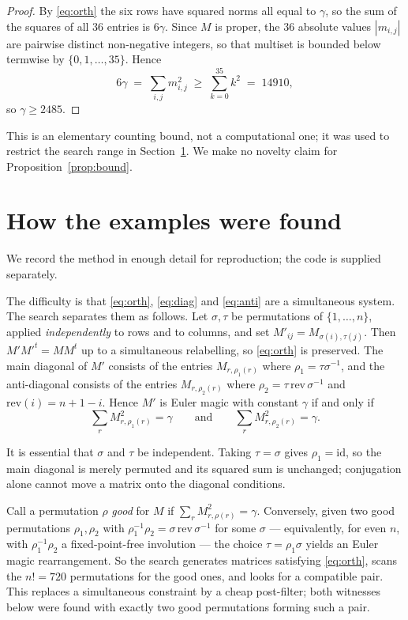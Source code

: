 \documentclass[11pt]{amsart}
\theoremstyle{plain}
\theoremstyle{definition}
\begin{document}
\begin{proof}
By \eqref{eq:orth} the six rows have squared norms all equal to $\gamma$, so the
sum of the squares of all $36$ entries is $6\gamma$. Since $M$ is proper, the
$36$ absolute values $|m_{i,j}|$ are pairwise distinct non-negative integers, so
that multiset is bounded below termwise by $\{0,1,\dots,35\}$. Hence
\[
6\gamma \;=\; \sum_{i,j} m_{i,j}^2 \;\geq\; \sum_{k=0}^{35} k^2 \;=\; 14910,
\]
so $\gamma \geq 2485$.
\end{proof}

This is an elementary counting bound, not a computational one; it was used to
restrict the search range in Section~\ref{sec:method}. We make no novelty claim
for Proposition~\ref{prop:bound}.


\section{How the examples were found}\label{sec:method}

We record the method in enough detail for reproduction; the code is supplied
separately.

The difficulty is that \eqref{eq:orth}, \eqref{eq:diag} and \eqref{eq:anti} are a
simultaneous system. The search separates them as follows. Let $\sigma,\tau$ be
permutations of $\{1,\dots,n\}$, applied \emph{independently} to rows and to
columns, and set $M'_{ij}=M_{\sigma(i),\tau(j)}$. Then $M'M'^{t}=MM^{t}$ up to a
simultaneous relabelling, so \eqref{eq:orth} is preserved. The main diagonal of
$M'$ consists of the entries $M_{r,\rho_1(r)}$ where $\rho_1=\tau\sigma^{-1}$,
and the anti-diagonal consists of the entries $M_{r,\rho_2(r)}$ where
$\rho_2=\tau\,\mathrm{rev}\,\sigma^{-1}$ and $\mathrm{rev}(i)=n+1-i$. Hence $M'$
is Euler magic with constant $\gamma$ if and only if
\[
\sum_{r} M_{r,\rho_1(r)}^{2}=\gamma
\qquad\text{and}\qquad
\sum_{r} M_{r,\rho_2(r)}^{2}=\gamma .
\]

It is essential that $\sigma$ and $\tau$ be independent. Taking $\tau=\sigma$
gives $\rho_1=\mathrm{id}$, so the main diagonal is merely permuted and its
squared sum is unchanged; conjugation alone cannot move a matrix onto the
diagonal conditions.

Call a permutation $\rho$ \emph{good} for $M$ if $\sum_r M_{r,\rho(r)}^2=\gamma$.
Conversely, given two good permutations $\rho_1,\rho_2$ with
$\rho_1^{-1}\rho_2=\sigma\,\mathrm{rev}\,\sigma^{-1}$ for some $\sigma$ ---
equivalently, for even $n$, with $\rho_1^{-1}\rho_2$ a fixed-point-free
involution --- the choice $\tau=\rho_1\sigma$ yields an Euler magic
rearrangement. So the search generates matrices satisfying \eqref{eq:orth},
scans the $n!=720$ permutations for the good ones, and looks for a compatible
pair. This replaces a simultaneous constraint by a cheap post-filter; both
witnesses below were found with exactly two good permutations forming such a
pair.
\end{document}
